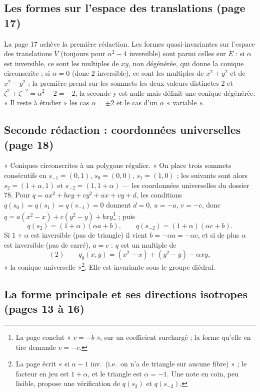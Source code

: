 \documentclass[11pt,a4paper]{article}
\begin{document}
\subsection*{Les formes sur l'espace des translations (page 17)}

La page 17 achève la première rédaction. Les formes quasi-invariantes sur
l'espace des translations $\check{V}$ (toujours pour $\alpha^2 - 4$ inversible) sont
parmi celles sur $\check{E}$ : si $\alpha$ est inversible, ce sont les multiples
de $xy$, non dégénérée, qui donne la conique circonscrite ; si $\alpha = 0$
(donc $2$ inversible), ce sont les multiples de $x^2 + y^2$ et de $x^2 - y^2$ ; la
première prend sur les sommets les deux valeurs distinctes $2$ et $\zeta^2 +
\zeta^{-2} = \alpha^2 - 2 = -2$, la seconde y est nulle mais définit une conique
dégénérée. « Il reste à étudier » les cas $\alpha = \pm 2$ et le cas d'un $\alpha$
« variable ».

\subsection*{Seconde rédaction : coordonnées universelles (page 18)}

« Coniques circonscrites à un polygone régulier. » On place trois sommets
consécutifs en $s_{-1} = (0, 1)$, $s_0 = (0, 0)$, $s_1 = (1, 0)$ ; les suivants
sont alors $s_2 = (1 + \alpha, 1)$ et $s_{-2} = (1, 1 + \alpha)$ — les coordonnées
universelles du dossier 78. Pour $q = ax^2 + bxy + cy^2 + ux + vy + d$, les
conditions $q(s_0) = q(s_1) = q(s_{-1}) = 0$ donnent $d = 0$, $u = -a$, $v = -c$,
donc $q = a(x^2 - x) + c(y^2 - y) + bxy$\footnote{La page conclut « $v = -b$ »,
sur un coefficient surchargé ; la forme qu'elle en tire demande $v = -c$.} ; puis
\[
  q(s_2) = (1 + \alpha)(\alpha a + b), \qquad q(s_{-2}) = (1 + \alpha)(\alpha c + b).
\]
Si $1 + \alpha$ est inversible (pas de triangle) il vient $b = -\alpha a =
-\alpha c$, et si de plus $\alpha$ est inversible (pas de carré), $a = c$ : $q$ est
un multiple de
\[
  (2) \qquad q_0(x, y) = (x^2 - x) + (y^2 - y) - \alpha xy ,
\]
« la conique universelle »\footnote{La page écrit « si $\alpha - 1$ inv.\ (i.e.\
on n'a de triangle sur aucune fibre) » ; le facteur en jeu est $1 + \alpha$, et le
triangle est $\alpha = -1$. Une note en coin, peu lisible, propose une
vérification de $q(s_2)$ et $q(s_{-2})$.}. Elle est invariante sous le groupe
diédral.

\subsection*{La forme principale et ses directions isotropes (pages 13 à 16)}
\end{document}
